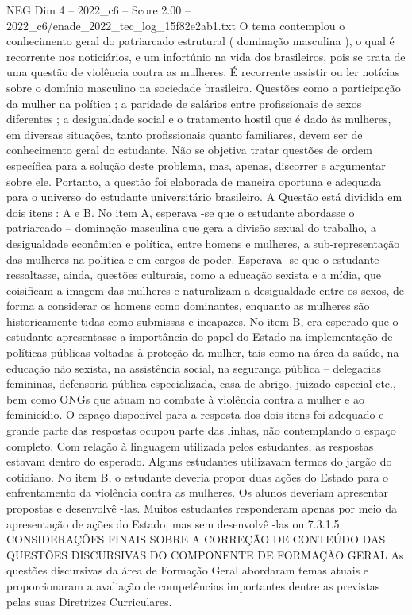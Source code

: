 \begin{textsample}{NEG Dim 4 – 2022\_c6 – Score 2.00 – 2022\_c6/enade\_2022\_tec\_log\_15f82e2ab1.txt}
O tema contemplou o conhecimento geral do patriarcado estrutural ( dominação masculina ), o qual é recorrente nos noticiários, e um infortúnio na vida dos brasileiros, pois se trata de uma questão de violência contra as mulheres.
É recorrente assistir ou ler notícias sobre o domínio masculino na sociedade brasileira.
Questões como a participação da mulher na política ; a paridade de salários entre profissionais de sexos diferentes ; a desigualdade social e o tratamento hostil que é dado às mulheres, em diversas situações, tanto profissionais quanto familiares, devem ser de conhecimento geral do estudante.
Não se objetiva tratar questões de ordem específica para a solução deste problema, mas, apenas, discorrer e argumentar sobre ele.
Portanto, a questão foi elaborada de maneira oportuna e adequada para o universo do estudante universitário brasileiro.
A Questão está dividida em dois itens : A e B.
No item A, esperava -se que o estudante abordasse o patriarcado – dominação masculina que gera a divisão sexual do trabalho, a desigualdade econômica e política, entre homens e mulheres, a sub-representação das mulheres na política e em cargos de poder.
Esperava -se que o estudante ressaltasse, ainda, questões culturais, como a educação sexista e a mídia, que coisificam a imagem das mulheres e naturalizam a desigualdade entre os sexos, de forma a considerar os homens como dominantes, enquanto as mulheres são historicamente tidas como submissas e incapazes.
No item B, era esperado que o estudante apresentasse a importância do papel do Estado na implementação de políticas públicas voltadas à proteção da mulher, tais como na área da saúde, na educação não sexista, na assistência social, na segurança pública – delegacias femininas, defensoria pública especializada, casa de abrigo, juizado especial etc., bem como ONGs que atuam no combate à violência contra a mulher e ao feminicídio.
O espaço disponível para a resposta dos dois itens foi adequado e grande parte das respostas ocupou parte das linhas, não contemplando o espaço completo.
Com relação à linguagem utilizada pelos estudantes, as respostas estavam dentro do esperado.
Alguns estudantes utilizavam termos do jargão do cotidiano.
No item B, o estudante deveria propor duas ações do Estado para o enfrentamento da violência contra as mulheres.
Os alunos deveriam apresentar propostas e desenvolvê -las.
Muitos estudantes responderam apenas por meio da apresentação de ações do Estado, mas sem desenvolvê -las ou 7.3.1.5 CONSIDERAÇÕES FINAIS SOBRE A CORREÇÃO DE CONTEÚDO DAS QUESTÕES DISCURSIVAS DO COMPONENTE DE FORMAÇÃO GERAL As questões discursivas da área de Formação Geral abordaram temas atuais e proporcionaram a avaliação de competências importantes dentre as previstas pelas suas Diretrizes Curriculares.

\end{textsample}
